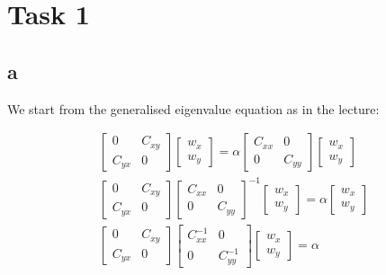 \section*{Task 1}

\subsection*{a}

We start from the generalised eigenvalue equation as in the lecture: 

\begin{gather*}
 \begin{bmatrix}
0 & C_{xy} \\
C_{yx} & 0 
\end{bmatrix}
 \begin{bmatrix}
w_x \\
w_y 
\end{bmatrix}
= \alpha
 \begin{bmatrix}
C_{xx} & 0 \\
0 & C_{yy} 
\end{bmatrix}
 \begin{bmatrix}
w_x \\
w_y 
\end{bmatrix} \\
 \begin{bmatrix}
0 & C_{xy} \\
C_{yx} & 0 
\end{bmatrix}
 \begin{bmatrix}
C_{xx} & 0 \\
0 & C_{yy} 
\end{bmatrix}^{-1}
 \begin{bmatrix}
w_x \\
w_y 
\end{bmatrix}
= \alpha
 \begin{bmatrix}
w_x \\
w_y 
\end{bmatrix} \\
 \begin{bmatrix}
0 & C_{xy} \\
C_{yx} & 0 
\end{bmatrix}
 \begin{bmatrix}
C_{xx}^{-1} & 0 \\
0 & C_{yy}^{-1} 
\end{bmatrix}
 \begin{bmatrix}
w_x \\
w_y 
\end{bmatrix}
= \alpha

\end{gather*}
